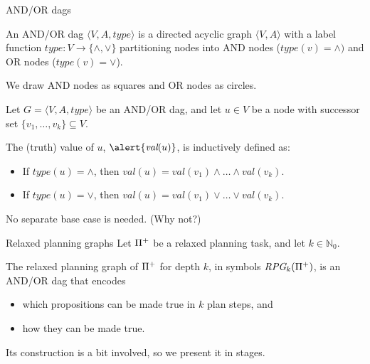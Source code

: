 \documentclass{gkibeamer}
\begin{document}
\begin{frame}{AND/OR dags}
  \begin{definition}
    An \alert{AND/OR dag}
    $\langle V, A, \textit{type}\rangle$
    is a directed acyclic graph $\langle V, A\rangle$ with a
    label function $\textit{type}: V \to \{ \land, \lor\}$
    partitioning nodes into \alert{AND nodes} ($\textit{type}(v) = \land)$
    and \alert{OR nodes} ($\textit{type}(v) = \lor$).
  \end{definition}
  
   We draw AND nodes as squares and OR
  nodes as circles.

  \begin{definition}
    Let $G = \langle V, A, \textit{type}\rangle$ be an AND/OR dag, and
    let $u \in V$ be a node with successor set $\{v_1, \dots, v_k\}
      \subseteq V$.

    \medskip

    The (truth) \alert{value} of $u$, $\alert{\textit{val}(u)}$, is
    inductively defined as:
    \begin{itemize}
    \item If $\textit{type}(u) = \land$, then
      $\textit{val}(u) = \textit{val}(v_1) \land \dots \land
      \textit{val}(v_k)$.
    \item If $\textit{type}(u) = \lor$, then
      $\textit{val}(u) = \textit{val}(v_1) \lor \dots \lor
      \textit{val}(v_k)$.
    \end{itemize}
  \end{definition}
   No separate base case is needed. (Why not?)
\end{frame}

\begin{frame}{Relaxed planning graphs}
  Let ${\Pi}^+$ be a relaxed planning task, and let $k \in
  \mathbb N_0$.

  \medskip

  The \alert{relaxed planning graph} of ${\Pi}^+$ for depth
  $k$, in symbols \alert{$\textit{RPG}_k({\Pi}^+)$}, is an
  AND/OR dag that encodes
  \begin{itemize}
  \item \alert{which propositions} can be made true in $k$ plan
    steps, and
  \item \alert{how} they can be made true.
  \end{itemize}
  
  \smallskip

  Its construction is a bit involved, so we present it in stages.
\end{frame}
\end{document}
